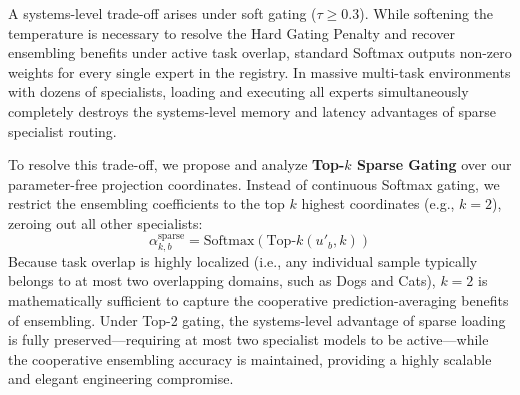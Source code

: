 A systems-level trade-off arises under soft gating ($\tau \ge 0.3$). While softening the temperature is necessary to resolve the Hard Gating Penalty and recover ensembling benefits under active task overlap, standard Softmax outputs non-zero weights for every single expert in the registry. In massive multi-task environments with dozens of specialists, loading and executing all experts simultaneously completely destroys the systems-level memory and latency advantages of sparse specialist routing.

To resolve this trade-off, we propose and analyze \textbf{Top-$k$ Sparse Gating} over our parameter-free projection coordinates. Instead of continuous Softmax gating, we restrict the ensembling coefficients to the top $k$ highest coordinates (e.g., $k=2$), zeroing out all other specialists:
\begin{equation}
\alpha_{k, b}^{\text{sparse}} = \text{Softmax}(\text{Top-}k(u'_{b}, k))
\end{equation}
Because task overlap is highly localized (i.e., any individual sample typically belongs to at most two overlapping domains, such as Dogs and Cats), $k=2$ is mathematically sufficient to capture the cooperative prediction-averaging benefits of ensembling. Under Top-2 gating, the systems-level advantage of sparse loading is fully preserved—requiring at most two specialist models to be active—while the cooperative ensembling accuracy is maintained, providing a highly scalable and elegant engineering compromise.

